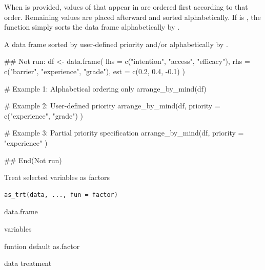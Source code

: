 \documentclass[a4paper]{book}
\begin{document}
%
\begin{Details}
When  is provided, values of  that appear in
 are ordered first according to that order. Remaining
values are placed afterward and sorted alphabetically.
If  is , the function simply sorts the data
frame alphabetically by .
\end{Details}
%
\begin{Value}
A data frame sorted by user-defined priority and/or
alphabetically by .
\end{Value}
%
\begin{Examples}
\begin{ExampleCode}
\#\# Not run: 
df <- data.frame(
  lhs = c("intention", "access", "efficacy"),
  rhs = c("barrier", "experience", "grade"),
  est = c(0.2, 0.4, -0.1)
)

# Example 1: Alphabetical ordering only
arrange_by_mind(df)

# Example 2: User-defined priority
arrange_by_mind(df,
  priority = c("experience", "grade")
)

# Example 3: Partial priority specification
arrange_by_mind(df,
  priority = "experience"
)

## End(Not run)
\end{ExampleCode}
\end{Examples}
%
\begin{Description}
Treat selected variables as factors
\end{Description}
%
\begin{Usage}
\begin{verbatim}
as_trt(data, ..., fun = factor)
\end{verbatim}
\end{Usage}
%
\begin{Arguments}
\begin{ldescription}
\item[\code{data}] data.frame

\item[\code{...}] variables

\item[\code{fun}] funtion default as.factor
\end{ldescription}
\end{Arguments}
%
\begin{Value}
data treatment
\end{Value}
%
\end{document}
